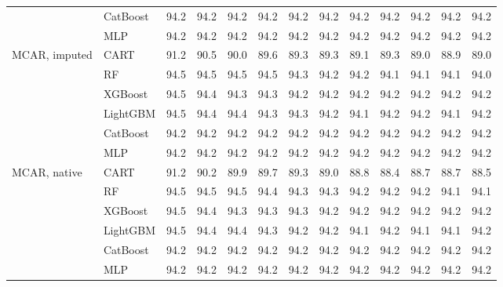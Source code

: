 \documentclass[pdflatex,sn-mathphys]{sn-jnl}
\theoremstyle{thmstyleone}
\begin{document}
\begin{table}[htbp]
\begin{tabular}{@{}llrrrrrrrrrrr@{}}
 & CatBoost & 94.2 & 94.2 & 94.2 & 94.2 & 94.2 & 94.2 & 94.2 & 94.2 & 94.2 & 94.2 & 94.2 \\
 & MLP & 94.2 & 94.2 & 94.2 & 94.2 & 94.2 & 94.2 & 94.2 & 94.2 & 94.2 & 94.2 & 94.2 \\
\midrule
MCAR, imputed & CART & 91.2 & 90.5 & 90.0 & 89.6 & 89.3 & 89.3 & 89.1 & 89.3 & 89.0 & 88.9 & 89.0 \\
 & RF & 94.5 & 94.5 & 94.5 & 94.5 & 94.3 & 94.2 & 94.2 & 94.1 & 94.1 & 94.1 & 94.0 \\
 & XGBoost & 94.5 & 94.4 & 94.3 & 94.3 & 94.2 & 94.2 & 94.2 & 94.2 & 94.2 & 94.2 & 94.2 \\
 & LightGBM & 94.5 & 94.4 & 94.4 & 94.3 & 94.3 & 94.2 & 94.1 & 94.2 & 94.2 & 94.1 & 94.2 \\
 & CatBoost & 94.2 & 94.2 & 94.2 & 94.2 & 94.2 & 94.2 & 94.2 & 94.2 & 94.2 & 94.2 & 94.2 \\
 & MLP & 94.2 & 94.2 & 94.2 & 94.2 & 94.2 & 94.2 & 94.2 & 94.2 & 94.2 & 94.2 & 94.2 \\
\midrule
MCAR, native & CART & 91.2 & 90.2 & 89.9 & 89.7 & 89.3 & 89.0 & 88.8 & 88.4 & 88.7 & 88.7 & 88.5 \\
 & RF & 94.5 & 94.5 & 94.5 & 94.4 & 94.3 & 94.3 & 94.2 & 94.2 & 94.2 & 94.1 & 94.1 \\
 & XGBoost & 94.5 & 94.4 & 94.3 & 94.3 & 94.3 & 94.2 & 94.2 & 94.2 & 94.2 & 94.2 & 94.2 \\
 & LightGBM & 94.5 & 94.4 & 94.4 & 94.3 & 94.2 & 94.2 & 94.1 & 94.2 & 94.1 & 94.1 & 94.2 \\
 & CatBoost & 94.2 & 94.2 & 94.2 & 94.2 & 94.2 & 94.2 & 94.2 & 94.2 & 94.2 & 94.2 & 94.2 \\
 & MLP & 94.2 & 94.2 & 94.2 & 94.2 & 94.2 & 94.2 & 94.2 & 94.2 & 94.2 & 94.2 & 94.2 \\
\bottomrule
\end{tabular}
\end{table}
\end{document}
